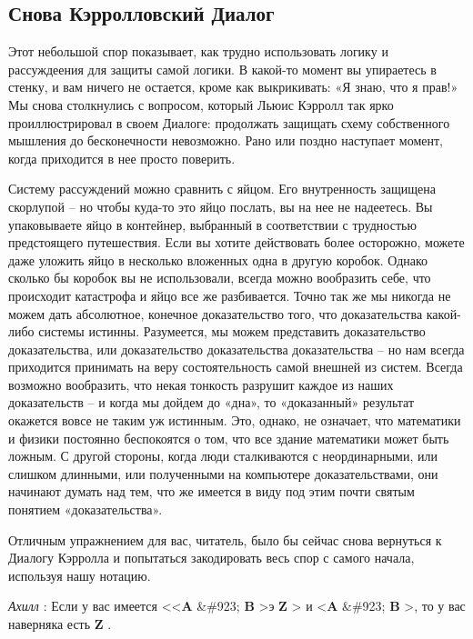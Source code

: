 \documentclass[../main.tex]{subfiles}
\begin{document}
\subsection{Снова Кэрролловский Диалог}

Этот небольшой спор показывает, как трудно использовать логику и рассуждеения для защиты самой логики. В какой-то момент вы упираетесь в стенку, и вам ничего не остается, кроме как выкрикивать: «Я знаю, что я прав!» Мы снова столкнулись с вопросом, который Льюис Кэрролл так ярко проиллюстрировал в своем Диалоге: продолжать защищать схему собственного мышления до бесконечности невозможно. Рано или поздно наступает момент, когда приходится в нее просто поверить.

Систему рассуждений можно сравнить с яйцом. Его внутренность защищена скорлупой \--- но чтобы куда-то это яйцо послать, вы на нее не надеетесь. Вы упаковываете яйцо в контейнер, выбранный в соответствии с трудностью предстоящего путешествия. Если вы хотите действовать более осторожно, можете даже уложить яйцо в несколько вложенных одна в другую коробок. Однако сколько бы коробок вы не использовали, всегда можно вообразить себе, что происходит катастрофа и яйцо все же разбивается. Точно так же мы никогда не можем дать абсолютное, конечное доказательство того, что доказательства какой-либо системы истинны. Разумеется, мы можем представить доказательство доказательства, или доказательство доказательства доказательства \--- но нам всегда приходится принимать на веру состоятельность самой внешней из систем. Всегда возможно вообразить, что некая тонкость разрушит каждое из наших доказательств \--- и когда мы дойдем до «дна», то «доказанный» результат окажется вовсе не таким уж истинным. Это, однако, не означает, что математики и физики постоянно беспокоятся о том, что все здание математики может быть ложным. С другой стороны, когда люди сталкиваются с неординарными, или слишком длинными, или полученными на компьютере доказательствами, они начинают думать над тем, что же имеется в виду под этим почти святым понятием «доказательства».

Отличным упражнением для вас, читатель, было бы сейчас снова вернуться к Диалогу Кэрролла и попытаться закодировать весь спор с самого начала, используя нашу нотацию.

\emph{Ахилл} : Если у вас имеется \textless\textless{}\textbf{A} \&\#923; \textbf{B} \textgreater э \textbf{Z} \textgreater{} и \textless{}\textbf{A} \&\#923; \textbf{B} \textgreater, то у вас наверняка есть \textbf{Z} .
\end{document}
